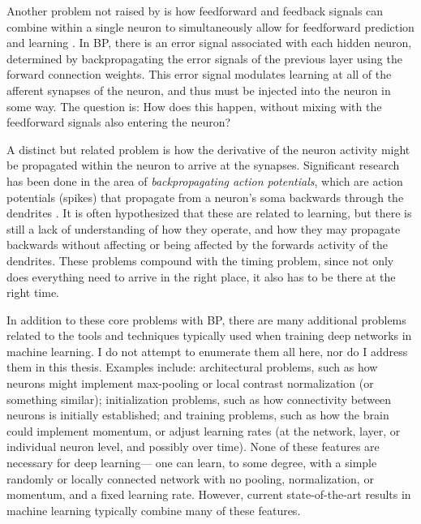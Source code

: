 Another problem not raised by \textcite{Bengio2015}
is how feedforward and feedback signals can combine within a single neuron
to simultaneously allow for feedforward prediction and learning \parencite{Guergiuev2017}.
In BP, there is an error signal associated with each hidden neuron,
determined by backpropagating the error signals of the previous layer
using the forward connection weights.
This error signal modulates learning at all of the afferent synapses of the neuron,
and thus must be injected into the neuron in some way.
The question is: How does this happen,
without mixing with the feedforward signals also entering the neuron?

A distinct but related problem is how the derivative of the neuron activity
might be propagated within the neuron to arrive at the synapses.
Significant research has been done in the area of \emph{backpropagating action potentials},
which are action potentials (spikes) that propagate from a neuron's soma
backwards through the dendrites \parencite{Waters2005}.
It is often hypothesized that these are related to learning,
but there is still a lack of understanding of how they operate,
and how they may propagate backwards without affecting or being affected by
the forwards activity of the dendrites.
These problems compound with the timing problem,
since not only does everything need to arrive in the right place,
it also has to be there at the right time.

In addition to these core problems with BP,
there are many additional problems related to the tools and techniques
typically used when training deep networks in machine learning.
I do not attempt to enumerate them all here,
nor do I address them in this thesis.
Examples include:
architectural problems, such as how neurons might implement
max-pooling or local contrast normalization (or something similar);
initialization problems, such as how connectivity between neurons
is initially established;
and training problems, such as how the brain could implement momentum,
or adjust learning rates
(at the network, layer, or individual neuron level, and possibly over time).
None of these features are necessary for deep learning---%
one can learn, to some degree, with a simple randomly or locally connected
network with no pooling, normalization, or momentum, and a fixed learning rate.
However, current state-of-the-art results in machine learning
typically combine many of these features.

